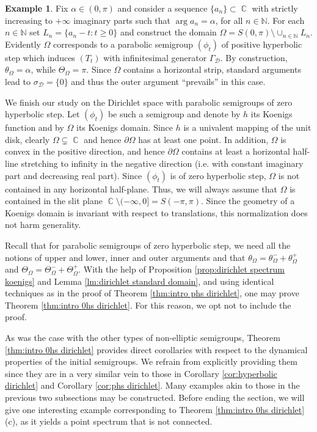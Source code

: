 \documentclass[11pt]{amsart}
\numberwithin{equation}{section}
\theoremstyle{definition}
\newtheorem{example}[theorem]{Example}
\DeclareMathOperator{\C}{\mathbb{C}}
\begin{document}
	
	\begin{example}
		Fix $\alpha\in(0,\pi)$ and consider a sequence $\{a_n\}\subset\C$ with strictly increasing to $+\infty$ imaginary parts such that $\arg a_n=\alpha$, for all $n\in\mathbb{N}$. For each $n\in\mathbb{N}$ set $L_n=\{a_n-t:t\ge0\}$ and construct the domain $\Omega=S(0,\pi)\setminus\cup_{n\in\mathbb{N}}L_n$. Evidently $\Omega$ corresponds to a parabolic semigroup $(\phi_t)$ of positive hyperbolic step which induces $(T_t)$ with infinitesimal generator $\Gamma_\mathcal{D}$. By construction, $\theta_\Omega=\alpha$, while $\Theta_\Omega=\pi$. Since $\Omega$ contains a horizontal strip, standard arguments lead to $\sigma_\mathcal{D}=\{0\}$ and thus the outer argument ``prevails'' in this case.
	\end{example}
	
	We finish our study on the Dirichlet space with parabolic semigroups of zero hyperbolic step. Let $(\phi_t)$ be such a semigroup and denote by $h$ its Koenigs function and by $\Omega$ its Koenigs domain. Since $h$ is a univalent mapping of the unit disk, clearly $\Omega\subsetneq\C$ and hence $\partial\Omega$ has at least one point. In addition, $\Omega$ is convex in the positive direction, and hence $\partial\Omega$ contains at least a horizontal half-line stretching to infinity in the negative direction (i.e. with constant imaginary part and decreasing real part). Since $(\phi_t)$ is of zero hyperbolic step, $\Omega$ is not contained in any horizontal half-plane. Thus, we will always assume that $\Omega$ is contained in the slit plane $\C\setminus(-\infty,0]=S(-\pi,\pi)$. Since the geometry of a Koenigs domain is invariant with respect to translations, this normalization does not harm generality.
	
	Recall that for parabolic semigroups of zero hyperbolic step, we need all the notions of upper and lower, inner and outer arguments and that $\theta_\Omega=\theta_\Omega^-+\theta_\Omega^+$ and $\Theta_\Omega=\Theta_\Omega^-+\Theta_\Omega^+$. With the help of Proposition \ref{prop:dirichlet spectrum koenigs} and Lemma \ref{lm:dirichlet standard domain}, and using identical techniques as in the proof of Theorem \ref{thm:intro phs dirichlet}, one may prove Theorem \ref{thm:intro 0hs dirichlet}. For this reason, we opt not to include the proof. 
	
	As was the case with the other types of non-elliptic semigroups, Theorem \ref{thm:intro 0hs dirichlet} provides direct corollaries with respect to the dynamical properties of the initial semigroups. We refrain from explicitly providing them since they are in a very similar vein to those in Corollary \ref{cor:hyperbolic dirichlet} and Corollary \ref{cor:phs dirichlet}. Many examples akin to those in the previous two subsections may be constructed. Before ending the section, we will give one interesting example corresponding to Theorem \ref{thm:intro 0hs dirichlet}(c), as it yields a point spectrum that is not connected.
	
\end{document}
